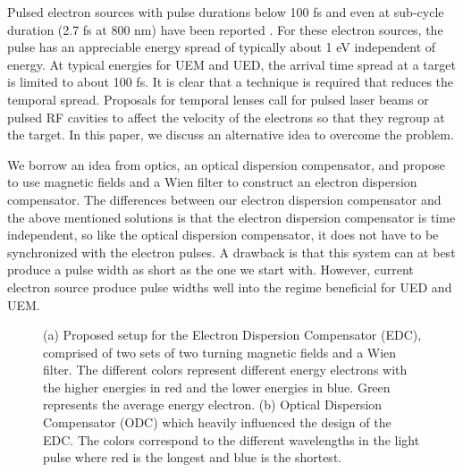 \documentclass[12pt,letterpaper]{article}
\begin{document}
Pulsed electron sources with pulse durations below 100 fs \cite{Bat} and even at sub-cycle duration (2.7 fs at 800 nm) have been reported \cite{hommelhoff}.  
For these electron sources, the pulse has an appreciable energy spread of typically about 1 eV independent of energy. 
At typical energies for UEM and UED, the arrival time spread at a target is limited to about 100 fs. 
It is clear that a technique is required that reduces the temporal spread. 
Proposals for temporal lenses call for pulsed laser beams \cite{PNAS} or pulsed RF cavities \cite{Kraus} to affect the velocity of the electrons so that they regroup at the target. 
In this paper, we discuss an alternative idea to overcome the problem.

We borrow an idea from optics, an optical dispersion compensator, and propose to use magnetic fields and a Wien filter to construct an  electron dispersion compensator. 
The differences between our electron dispersion compensator and the above mentioned solutions \cite{PNAS,Kraus} is that the electron dispersion compensator is time independent, so like the optical dispersion compensator, it does not have to be synchronized with the electron pulses. 
A drawback is that this system can at best produce a pulse width as short as the one we start with. 
However, current electron source produce pulse widths well into the regime beneficial for UED and UEM. \cite{Kraus}

\begin{figure}[tb]
   \centering
   \hspace{4mm}
   \caption{
   (a) Proposed setup for the Electron Dispersion Compensator (EDC), comprised of two sets of two turning magnetic fields and a Wien filter. 
   The different colors represent different energy electrons with the higher energies in red and the lower energies in blue. 
   Green represents the average energy electron. 
   (b) Optical Dispersion Compensator (ODC) which heavily influenced the design of the EDC. 
   The colors correspond to the different wavelengths in the light pulse where red is the longest and blue is the shortest.
   }
\end{figure}
\end{document}
